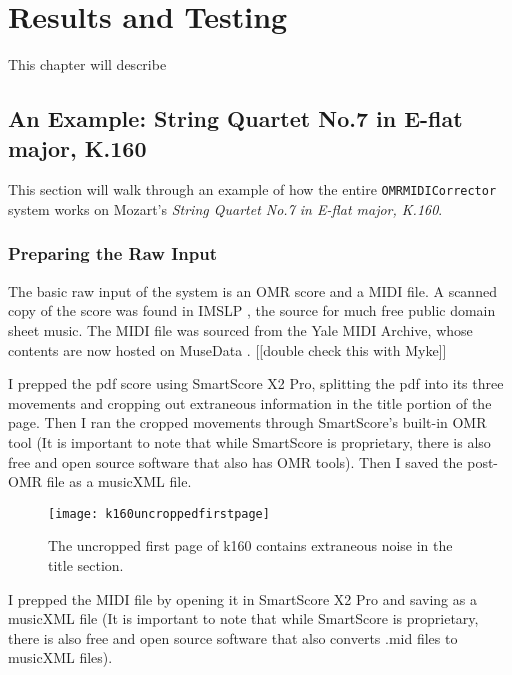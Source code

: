 \chapter{Results and Testing}
This chapter will describe 
\section{An Example: String Quartet No.7 in E-flat major, K.160}
This section will walk through an example of how the entire \texttt{OMRMIDICorrector} system works on Mozart's \textit{String Quartet No.7 in E-flat major, K.160}.

\subsection{Preparing the Raw Input}
The basic raw input of the system is an OMR score and a MIDI file. A scanned copy of the score was found in IMSLP \cite{k160}, the source for much free public domain sheet music. The MIDI file was sourced from the Yale MIDI Archive\cite{yalemidiarchive}, whose contents are now hosted on MuseData \cite{musedata}. [[double check this with Myke]]

I prepped the pdf score using SmartScore X2 Pro, splitting the pdf into its three movements and cropping out extraneous information in the title portion of the page. Then I ran the cropped movements through SmartScore's built-in OMR tool (It is important to note that while SmartScore is proprietary, there is also free and open source software that also has OMR tools). Then I saved the post-OMR file as a musicXML file. 

\begin{figure}[!ht]
\centering
\texttt{[image: k160uncroppedfirstpage]}
\caption{The uncropped first page of k160 contains extraneous noise in the title section.}
\end{figure}

I prepped the MIDI file by opening it in SmartScore X2 Pro and saving as a musicXML file (It is important to note that while SmartScore is proprietary, there is also free and open source software that also converts .mid files to musicXML files).

